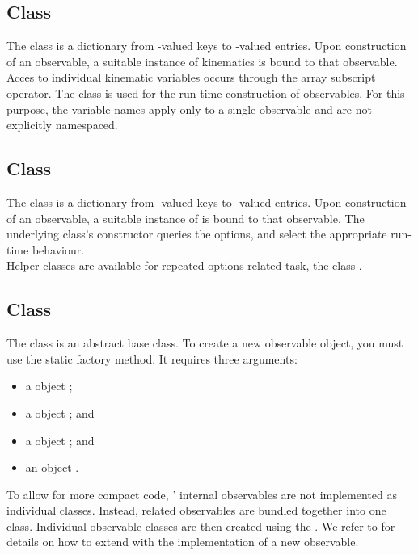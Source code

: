 \subsection{Class }

The class  is a dictionary from -valued keys to
-valued entries. Upon construction of an observable, a suitable instance
of kinematics is bound to that observable. Acces to individual kinematic variables
occurs through the array subscript operator.
The class is used for the run-time construction of observables. For this purpose,
the variable names apply only to a single observable and are not explicitly namespaced.


\subsection{Class }

The class  is a dictionary from -valued keys to
-valued entries. Upon construction of an observable, a suitable instance
of  is bound to that observable. The underlying class's constructor
queries the options, and select the appropriate run-time behaviour.\\

Helper classes are available for repeated options-related task, \eg the class
.


\subsection{Class }

The class  is an abstract base class. To create a new observable object,
you must use the static  factory method. It requires three arguments:
\begin{itemize}
    \item a  object ;
    \item a  object ; and
    \item a  object ; and
    \item an  object .
\end{itemize}

To allow for more compact code, \EOS' internal observables are not implemented as individual
classes. Instead, related observables are bundled together into one class. Individual observable
classes are then created using the . We refer to
 for details on how to extend \EOS with the implementation
of a new observable.\\


